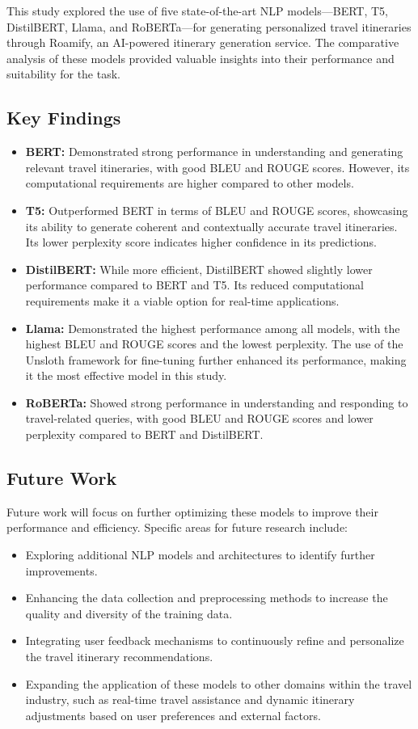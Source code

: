 \documentclass[conference]{IEEEtran}
\begin{document}
This study explored the use of five state-of-the-art NLP models—BERT, T5, DistilBERT, Llama, and RoBERTa—for generating personalized travel itineraries through Roamify, an AI-powered itinerary generation service. The comparative analysis of these models provided valuable insights into their performance and suitability for the task.

\subsection{Key Findings}

\begin{itemize}
    \item \textbf{BERT:} Demonstrated strong performance in understanding and generating relevant travel itineraries, with good BLEU and ROUGE scores. However, its computational requirements are higher compared to other models.
    \item \textbf{T5:} Outperformed BERT in terms of BLEU and ROUGE scores, showcasing its ability to generate coherent and contextually accurate travel itineraries. Its lower perplexity score indicates higher confidence in its predictions.
    \item \textbf{DistilBERT:} While more efficient, DistilBERT showed slightly lower performance compared to BERT and T5. Its reduced computational requirements make it a viable option for real-time applications.
    \item \textbf{Llama:} Demonstrated the highest performance among all models, with the highest BLEU and ROUGE scores and the lowest perplexity. The use of the Unsloth framework for fine-tuning further enhanced its performance, making it the most effective model in this study.
    \item \textbf{RoBERTa:} Showed strong performance in understanding and responding to travel-related queries, with good BLEU and ROUGE scores and lower perplexity compared to BERT and DistilBERT.
\end{itemize}

\subsection{Future Work}

Future work will focus on further optimizing these models to improve their performance and efficiency. Specific areas for future research include:
\begin{itemize}
    \item Exploring additional NLP models and architectures to identify further improvements.
    \item Enhancing the data collection and preprocessing methods to increase the quality and diversity of the training data.
    \item Integrating user feedback mechanisms to continuously refine and personalize the travel itinerary recommendations.
    \item Expanding the application of these models to other domains within the travel industry, such as real-time travel assistance and dynamic itinerary adjustments based on user preferences and external factors.
\end{itemize}
\end{document}
